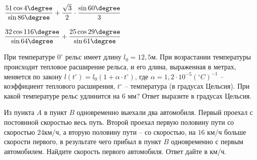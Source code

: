 \begin{class}[number=2]
\begin{listofex}
\begin{enumcols}[itemcolumns=2]
			\item \( \dfrac{51\cos 4\degree}{\sin 86\degree}+\dfrac{\sqrt{3}}{2}\cdot\dfrac{\sin 60\degree}{3} \)
			\item \( \dfrac{32\cos116\degree}{\sin 64\degree}+\dfrac{25\cos 29\degree}{\sin 61\degree} \)
		\end{enumcols}
		\item При температуре \( 0^{\circ}  \) рельс имеет длину \( l_0=12,5 \)м. При возрастании температуры происходит тепловое расширение рельса, и его длина, выраженная в метрах, меняется по закону \( l(t^{\circ})=l_0(1+\alpha\cdot t^{\circ}) \), где  \( \alpha=1,2\cdot 10^{-5}(^{\circ}C)^{-1} \) – коэффициент теплового расширения, \( t^{\circ} \) – температура (в градусах Цельсия). При какой температуре рельс удлинится на \( 6 \) мм? Ответ выразите в градусах Цельсия.
		\item  Из пункта \( A \) в пункт \( B \) одновременно выехали два автомобиля. Первый проехал с постоянной скоростью весь путь. Второй проехал первую половину пути со скоростью \( 24 \)км/ч, а вторую половину пути – со скоростью, на \(16\) км/ч больше скорости первого, в результате чего прибыл в пункт \( B \) одновременно с первым автомобилем. Найдите скорость первого автомобиля. Ответ дайте в км/ч.
	\end{listofex}
\end{class}
